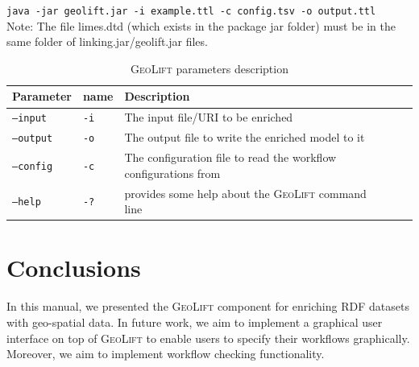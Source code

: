 \documentclass[a4paper,twoside,bibtotoc,abstracton,12pt,BCOR=15mm]{article}
\newcommand{\geolift}{\textsc{GeoLift}\xspace}
\begin{document}
{\flushleft\texttt{java -jar geolift.jar -i example.ttl -c config.tsv -o output.ttl}}
\newline
\\Note: The file limes.dtd (which exists in the package jar folder) must be in the same folder of linking.jar/geolift.jar files.
\begin{table}[ht]
\caption{\geolift parameters description} \label{tbl:geoLiftPram}
\begin{tabular}{@{}  l  l p{10.5cm} l p{}@{}}
\toprule
\textbf{Parameter} 	& \textbf{name}	& \textbf{Description}\\
\midrule
\texttt{--input} 	&\texttt{-i}	& The input file/URI to be enriched\\
\texttt{--output} 	&\texttt{-o} 	& The output file to write the enriched model to it\\
\texttt{--config} 	&\texttt{-c} 	& The configuration file to read the workflow configurations from\\
\texttt{--help}		&\texttt{-?} 	& provides some help about the \geolift command line \\
\bottomrule
\end{tabular}
\end{table}



\section{Conclusions}
In this manual, we presented the \geolift component for enriching RDF datasets with geo-spatial data.
In future work, we aim to implement a graphical user interface on top of \geolift to enable users to specify their workflows graphically.
Moreover, we aim to implement workflow checking functionality.



\end{document}
